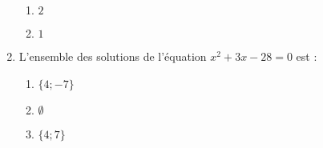 \documentclass[oneside,twocolumn,landscape]{book}
\begin{document}
\begin{enumerate}
\begin{enumerate}
\item\MauvaiseReponse $2$

\item\BonneReponse $1$

\end{enumerate}



\item L'ensemble des solutions de l'équation $x^{2}+3 x-28=0$ est :

\begin{enumerate}

\item\BonneReponse $\{4 ;-7\}$

\item\MauvaiseReponse $\emptyset$


\item\MauvaiseReponse $\{4 ; 7\}$

\end{enumerate}






\end{enumerate}
\end{document}
